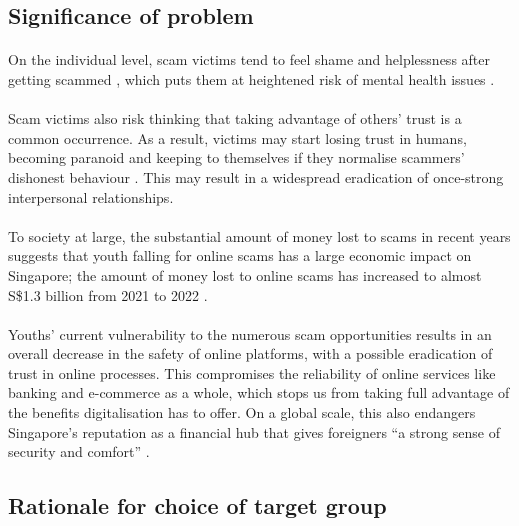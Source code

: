 \message{ !name(written-report.tex)}\documentclass[a4paper]{article}
\begin{document}
\subsection{Significance of problem}
\paragraph{} On the individual level, scam victims tend to feel shame and
helplessness after getting scammed \parencite{CNA.2022}, which puts them at
heightened risk of mental health issues \parencite{SiowDivi.2023}.

\paragraph{} Scam victims also risk thinking that taking advantage of others'
trust is a common occurrence. As a result, victims may start losing trust in
humans, becoming paranoid and keeping to themselves if they normalise scammers'
dishonest behaviour \parencite{SiowDivi.2023}. This may result in a widespread
eradication of once-strong interpersonal relationships.

\paragraph{} To society at large, the substantial amount of money lost to scams
in recent years suggests that youth falling for online scams has a large
economic impact on Singapore; the amount of money lost to online scams has
increased to almost S\$1.3 billion from 2021 to 2022 \parencite{Chua.2023}.

\paragraph{} Youths' current vulnerability to the numerous scam opportunities
results in an overall decrease in the safety of online platforms, with a
possible eradication of trust in online processes. This compromises the
reliability of online services like banking and e-commerce as a whole, which
stops us from taking full advantage of the benefits digitalisation has to offer.
On a global scale, this also endangers Singapore’s reputation as a financial hub
that gives foreigners ``a strong sense of security and comfort''
\parencite{Rikvin}.

\subsection{Rationale for choice of target group}
\end{document}

